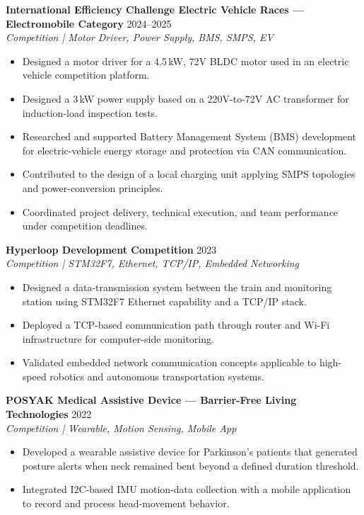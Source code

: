 \documentclass[a4paper,10pt]{article}
\begin{document}
\vspace{3pt}
\textbf{International Efficiency Challenge Electric Vehicle Races --- Electromobile Category}
\hfill 2024--2025\\
\textit{Competition | Motor Driver, Power Supply, BMS, SMPS, EV}
\begin{itemize}
  \item Designed a motor driver for a 4.5\,kW, 72V BLDC motor used in an electric vehicle
        competition platform.
  \item Designed a 3\,kW power supply based on a 220V-to-72V AC transformer for
        induction-load inspection tests.
  \item Researched and supported Battery Management System (BMS) development for
        electric-vehicle energy storage and protection via CAN communication.
  \item Contributed to the design of a local charging unit applying SMPS topologies and
        power-conversion principles.
  \item Coordinated project delivery, technical execution, and team performance under
        competition deadlines.
\end{itemize}

\vspace{3pt}
\textbf{Hyperloop Development Competition} \hfill 2023\\
\textit{Competition | STM32F7, Ethernet, TCP/IP, Embedded Networking}
\begin{itemize}
  \item Designed a data-transmission system between the train and monitoring station using
        STM32F7 Ethernet capability and a TCP/IP stack.
  \item Deployed a TCP-based communication path through router and Wi-Fi infrastructure
        for computer-side monitoring.
  \item Validated embedded network communication concepts applicable to high-speed robotics
        and autonomous transportation systems.
\end{itemize}

\vspace{3pt}
\textbf{POSYAK Medical Assistive Device --- Barrier-Free Living Technologies} \hfill 2022\\
\textit{Competition | Wearable, Motion Sensing, Mobile App}
\begin{itemize}
  \item Developed a wearable assistive device for Parkinson's patients that generated
        posture alerts when neck remained bent beyond a defined duration threshold.
  \item Integrated I2C-based IMU motion-data collection with a mobile application to
        record and process head-movement behavior.
\end{itemize}
\end{document}
